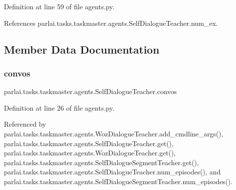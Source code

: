 Definition at line 59 of file agents.\+py.



References parlai.\+tasks.\+taskmaster.\+agents.\+Self\+Dialogue\+Teacher.\+num\+\_\+ex.



\subsection{Member Data Documentation}
\mbox{\label{classparlai_1_1tasks_1_1taskmaster_1_1agents_1_1SelfDialogueTeacher_a6a5215f1c64623de6962a32b95f27fac}} 
\subsubsection{\texorpdfstring{convos}{convos}}
{\footnotesize\ttfamily parlai.\+tasks.\+taskmaster.\+agents.\+Self\+Dialogue\+Teacher.\+convos}



Definition at line 26 of file agents.\+py.



Referenced by parlai.\+tasks.\+taskmaster.\+agents.\+Woz\+Dialogue\+Teacher.\+add\+\_\+cmdline\+\_\+args(), parlai.\+tasks.\+taskmaster.\+agents.\+Self\+Dialogue\+Teacher.\+get(), parlai.\+tasks.\+taskmaster.\+agents.\+Woz\+Dialogue\+Teacher.\+get(), parlai.\+tasks.\+taskmaster.\+agents.\+Self\+Dialogue\+Segment\+Teacher.\+get(), parlai.\+tasks.\+taskmaster.\+agents.\+Self\+Dialogue\+Teacher.\+num\+\_\+episodes(), and parlai.\+tasks.\+taskmaster.\+agents.\+Self\+Dialogue\+Segment\+Teacher.\+num\+\_\+episodes().

\mbox{\label{classparlai_1_1tasks_1_1taskmaster_1_1agents_1_1SelfDialogueTeacher_ac8110082f9ce0736ff129f93cf7740c1}} 
